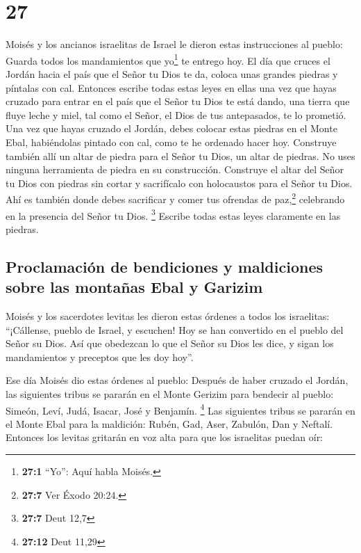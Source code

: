 \hypertarget{section-26}{%
\section{27}\label{section-26}}

 Moisés y los ancianos israelitas de Israel le dieron
estas instrucciones al pueblo: Guarda todos los mandamientos que
yo\footnote{\textbf{27:1} ``Yo'': Aquí habla Moisés.} te entrego hoy.
 El día que cruces el Jordán hacia el país que el Señor tu
Dios te da, coloca unas grandes piedras y píntalas con cal.
 Entonces escribe todas estas leyes en ellas una vez que
hayas cruzado para entrar en el país que el Señor tu Dios te está dando,
una tierra que fluye leche y miel, tal como el Señor, el Dios de tus
antepasados, te lo prometió.  Una vez que hayas cruzado el
Jordán, debes colocar estas piedras en el Monte Ebal, habiéndolas
pintado con cal, como te he ordenado hacer hoy.  Construye
también allí un altar de piedra para el Señor tu Dios, un altar de
piedras. No uses ninguna herramienta de piedra en su construcción.
 Construye el altar del Señor tu Dios con piedras sin
cortar y sacrifícalo con holocaustos para el Señor tu Dios.
 Ahí es también donde debes sacrificar y comer tus
ofrendas de paz,\footnote{\textbf{27:7} Ver Éxodo 20:24.} celebrando en
la presencia del Señor tu Dios. \footnote{\textbf{27:7} Deut 12,7}
 Escribe todas estas leyes claramente en las piedras.

\hypertarget{proclamaciuxf3n-de-bendiciones-y-maldiciones-sobre-las-montauxf1as-ebal-y-garizim}{%
\subsection{Proclamación de bendiciones y maldiciones sobre las montañas
Ebal y
Garizim}\label{proclamaciuxf3n-de-bendiciones-y-maldiciones-sobre-las-montauxf1as-ebal-y-garizim}}

 Moisés y los sacerdotes levitas les dieron estas órdenes
a todos los israelitas: ``¡Cállense, pueblo de Israel, y escuchen! Hoy
se han convertido en el pueblo del Señor su Dios.  Así
que obedezcan lo que el Señor su Dios les dice, y sigan los mandamientos
y preceptos que les doy hoy''.

 Ese día Moisés dio estas órdenes al pueblo:
 Después de haber cruzado el Jordán, las siguientes
tribus se pararán en el Monte Gerizim para bendecir al pueblo: Simeón,
Leví, Judá, Isacar, José y Benjamín. \footnote{\textbf{27:12} Deut 11,29}
 Las siguientes tribus se pararán en el Monte Ebal para
la maldición: Rubén, Gad, Aser, Zabulón, Dan y Neftalí. 
Entonces los levitas gritarán en voz alta para que los israelitas puedan
oír:

